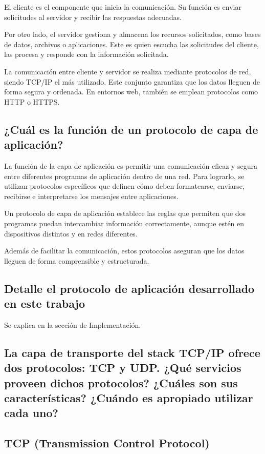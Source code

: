 \documentclass[a4paper,10pt]{article}
\begin{document}
El cliente es el componente que inicia la comunicación. Su función es enviar solicitudes al servidor y recibir las respuestas adecuadas.

Por otro lado, el servidor gestiona y almacena los recursos solicitados, como bases de datos, archivos o aplicaciones. Este es quien escucha las solicitudes del cliente, las procesa y responde con la información solicitada.

La comunicación entre cliente y servidor se realiza mediante protocolos de red, siendo TCP/IP el más utilizado. Este conjunto garantiza que los datos lleguen de forma segura y ordenada. En entornos web, también se emplean protocolos como HTTP o HTTPS.

\subsection{¿Cuál es la función de un protocolo de capa de aplicación?}
La función de la capa de aplicación es permitir una comunicación eficaz y segura entre diferentes programas de aplicación dentro de una red. Para lograrlo, se utilizan protocolos específicos que definen cómo deben formatearse, enviarse, recibirse e interpretarse los mensajes entre aplicaciones.

Un protocolo de capa de aplicación establece las reglas que permiten que dos programas puedan intercambiar información correctamente, aunque estén en dispositivos distintos y en redes diferentes.

Además de facilitar la comunicación, estos protocolos aseguran que los datos lleguen de forma comprensible y estructurada.

\subsection{Detalle el protocolo de aplicación desarrollado en este trabajo}
Se explica en la sección de Implementación.

\subsection{La capa de transporte del stack TCP/IP ofrece dos protocolos: TCP y UDP. ¿Qué servicios proveen dichos protocolos? ¿Cuáles son sus características? ¿Cuándo es apropiado utilizar cada uno?}

\subsection*{TCP (Transmission Control Protocol)}
\end{document}
